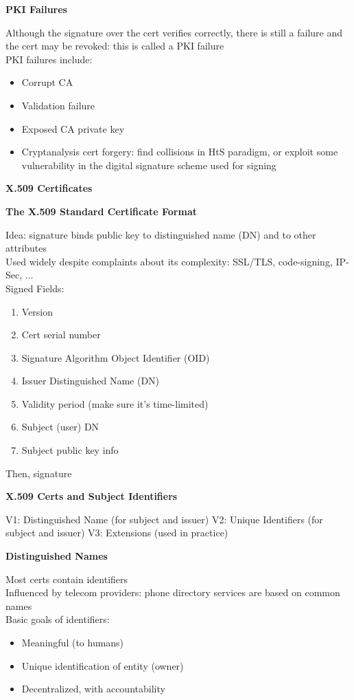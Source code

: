 \documentclass{article}
\begin{document}
\textbf{PKI Failures}

Although the signature over the cert verifies correctly, there is still a failure and the cert may be revoked: this is called a PKI failure\\
PKI failures include:\begin{itemize}
	\item Corrupt CA
	\item Validation failure
	\item Exposed CA private key
	\item Cryptanalysis cert forgery: find collisions in HtS paradigm, or exploit some vulnerability in the digital signature scheme used for signing
\end{itemize}

\textbf{X.509 Certificates}

\textbf{The X.509 Standard Certificate Format}

Idea: signature binds public key to distinguished name (DN) and to other attributes\\
Used widely despite complaints about its complexity: SSL/TLS, code-signing, IP-Sec, ...\\
Signed Fields:\begin{enumerate}
	\item Version
	\item Cert serial number
	\item Signature Algorithm Object Identifier (OID)
	\item Issuer Distinguished Name (DN)
	\item Validity period (make sure it's time-limited)
	\item Subject (user) DN
	\item Subject public key info
\end{enumerate}
Then, signature

\textbf{X.509 Certs and Subject Identifiers}

V1: Distinguished Name (for subject and issuer)
V2: Unique Identifiers (for subject and issuer)
V3: Extensions (used in practice)

\textbf{Distinguished Names}

Most certs contain identifiers\\
Influenced by telecom providers: phone directory services are based on common names\\
Basic goals of identifiers:\begin{itemize}
	\item Meaningful (to humans)
	\item Unique identification of entity (owner)
	\item Decentralized, with accountability
\end{itemize}
\end{document}
